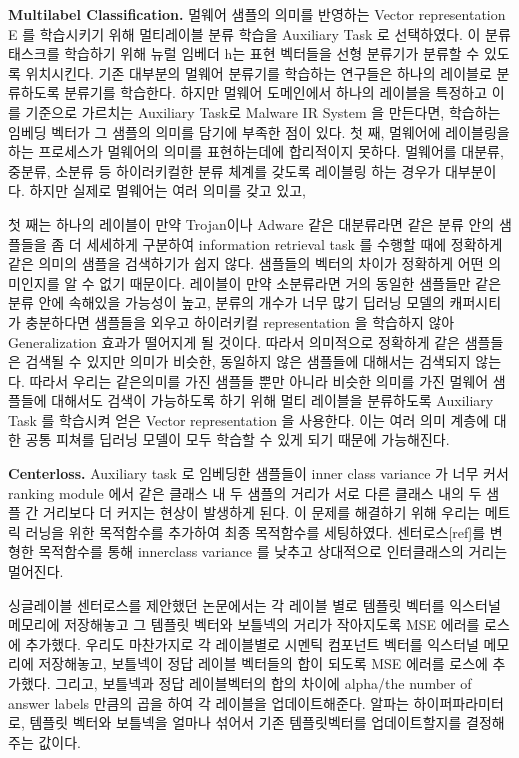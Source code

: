 \textbf{Multilabel Classification. }
멀웨어 샘플의 의미를 반영하는 Vector representation E 를 학습시키기 위해 멀티레이블 분류 학습을 Auxiliary Task 로 선택하였다. 이 분류 태스크를 학습하기 위해 뉴럴 임베더 h는 표현 벡터들을 선형 분류기가 분류할 수 있도록 위치시킨다. 기존 대부분의 멀웨어 분류기를 학습하는 연구들은 하나의 레이블로 분류하도록 분류기를 학습한다. 하지만 멀웨어 도메인에서 하나의 레이블을 특정하고 이를 기준으로 가르치는 Auxiliary Task로 Malware IR System 을 만든다면, 학습하는 임베딩 벡터가 그 샘플의 의미를 담기에 부족한 점이 있다. 첫 째, 멀웨어에 레이블링을 하는 프로세스가 멀웨어의 의미를 표현하는데에 합리적이지 못하다. 멀웨어를 대분류, 중분류, 소분류 등 하이러키컬한 분류 체계를 갖도록 레이블링 하는 경우가 대부분이다. 하지만 실제로 멀웨어는 여러 의미를 갖고 있고, 

첫 째는 하나의 레이블이 만약 Trojan이나 Adware 같은 대분류라면 같은 분류 안의 샘플들을 좀 더 세세하게 구분하여 information retrieval task 를 수행할 때에 정확하게 같은 의미의 샘플을 검색하기가 쉽지 않다. 샘플들의 벡터의 차이가 정확하게 어떤 의미인지를 알 수 없기 때문이다. 레이블이 만약 소분류라면 거의 동일한 샘플들만 같은 분류 안에 속해있을 가능성이 높고, 분류의 개수가 너무 많기 딥러닝 모델의 캐퍼시티가 충분하다면 샘플들을 외우고 하이러키컬 representation 을 학습하지 않아 Generalization 효과가 떨어지게 될 것이다. 따라서 의미적으로 정확하게 같은 샘플들은 검색될 수 있지만 의미가 비슷한, 동일하지 않은 샘플들에 대해서는 검색되지 않는다. 따라서 우리는 같은의미를 가진 샘플들 뿐만 아니라 비슷한 의미를 가진 멀웨어 샘플들에 대해서도 검색이 가능하도록 하기 위해 멀티 레이블을 분류하도록 Auxiliary Task 를 학습시켜 얻은 Vector representation 을 사용한다. 이는 여러 의미 계층에 대한 공통 피쳐를 딥러닝 모델이 모두 학습할 수 있게 되기 때문에 가능해진다. 



\textbf{Centerloss. }
Auxiliary task 로 임베딩한 샘플들이 inner class variance 가 너무 커서 ranking module 에서 같은 클래스 내 두 샘플의 거리가 서로 다른 클래스 내의 두 샘플 간 거리보다 더 커지는 현상이 발생하게 된다. 이 문제를 해결하기 위해 우리는 메트릭 러닝을 위한 목적함수를 추가하여 최종 목적함수를 세팅하였다. 센터로스[ref]를 변형한 목적함수를 통해 innerclass variance 를 낮추고 상대적으로 인터클래스의 거리는 멀어진다. 

싱글레이블 센터로스를 제안했던 논문에서는 각 레이블 별로 템플릿 벡터를 익스터널 메모리에 저장해놓고 그 템플릿 벡터와 보틀넥의 거리가 작아지도록 MSE 에러를 로스에 추가했다. 우리도 마찬가지로 각 레이블별로 시멘틱 컴포넌트 벡터를 익스터널 메모리에 저장해놓고, 보틀넥이 정답 레이블 벡터들의 합이 되도록 MSE 에러를 로스에 추가했다. 그리고, 보틀넥과 정답 레이블벡터의 합의 차이에 alpha/the number of answer labels 만큼의 곱을 하여 각 레이블을 업데이트해준다. 알파는 하이퍼파라미터로, 템플릿 벡터와 보틀넥을 얼마나 섞어서 기존 템플릿벡터를 업데이트할지를 결정해주는 값이다. 

